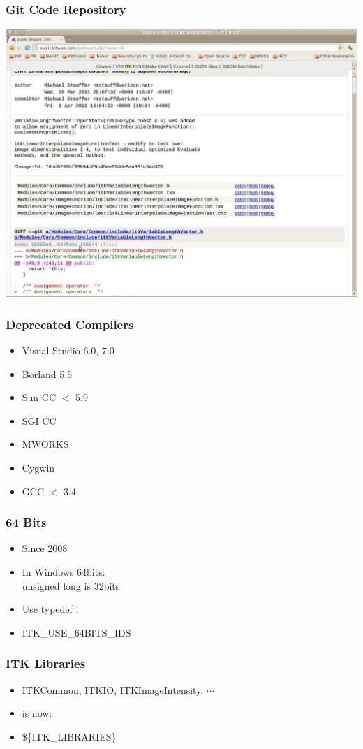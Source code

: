 {
\begin{frame}
  \frametitle{Git Code Repository}
  \includegraphics[width=\textwidth,height=\paperheight]{../Art/ITKGitScreenShot.jpg}
\end{frame}
}




{
\begin{frame}
\frametitle{Deprecated Compilers}
\Huge
\begin{itemize}
\item Visual Studio 6.0, 7.0
\pause
\item Borland 5.5
\pause
\item Sun CC $<$ 5.9
\pause
\item SGI CC
\pause
\item MWORKS
\pause
\item Cygwin
\pause
\item GCC $<$ 3.4
\end{itemize}
\end{frame}
}





{
\begin{frame}
\frametitle{64 Bits}
\Huge
\begin{itemize}
\item Since 2008
\pause
\item In Windows 64bits:\\unsigned long is 32bits
\pause
\item Use typedef !
\pause
\item ITK\_USE\_64BITS\_IDS
\end{itemize}
\end{frame}
}


{
\begin{frame}
\frametitle{ITK Libraries}
\Huge
\begin{itemize}
\item ITKCommon, ITKIO, ITKImageIntensity, $\cdots$
\pause
\item is now:
\pause
\item \$\{ITK\_LIBRARIES\}
\end{itemize}
\end{frame}
}


